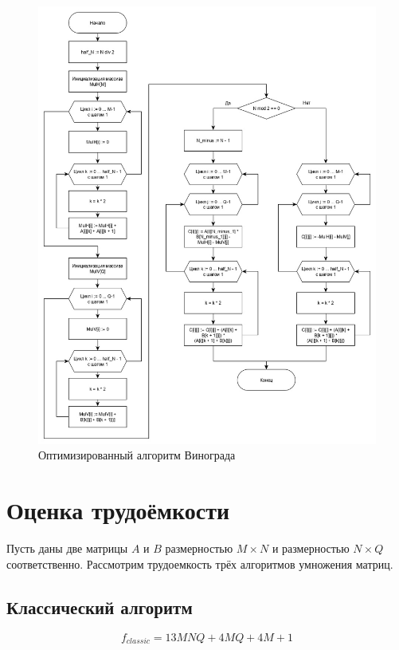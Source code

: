 \documentclass[12pt, a4paper]{report}
\begin{document}
	\begin{figure}[ht!]
		\centering
		\includegraphics[scale=0.55]{vin_opt.jpg}
		\caption{Оптимизированный алгоритм Винограда}
		\label{pic:optvin}
	\end{figure}

	\newpage

	\section{Оценка трудоёмкости}
	Пусть даны две матрицы $A$ и $B$ размерностью $M\times N$ и размерностью $N \times Q$ соответственно. Рассмотрим трудоемкость трёх алгоритмов умножения матриц.
	
	\subsection{Классический алгоритм}
	\begin{equation}
	\label{complex_classic}
	f_{classic} = 13MNQ + 4MQ + 4M + 1
	\end{equation}
	
\end{document}
